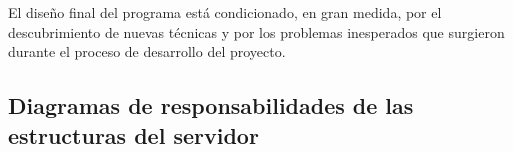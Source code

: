 \documentclass{article}
\begin{document}
    El diseño final del programa está condicionado, en gran medida, por el descubrimiento de nuevas técnicas y por los problemas inesperados que surgieron durante el proceso de desarrollo del proyecto.\\

\subsection{Diagramas de responsabilidades de las estructuras del servidor}

    \renewcommand{\arraystretch}{1.3}

    \newcommand{\crc}[2]
    {%
        \begin{tabular}{|l|l|}
            \hline
            \multicolumn{2}{|c|}{#1} \\
            \hline
            #2
            \hline
        \end{tabular}%
    }
\end{document}
